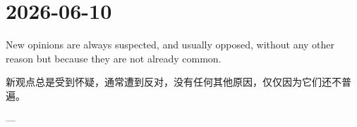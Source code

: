 \section*{2026-06-10}
New opinions are always suspected, and usually opposed, without any other reason but because they are not already common. \par
新观点总是受到怀疑，通常遭到反对，没有任何其他原因，仅仅因为它们还不普遍。 \par
\hfill ---  \par
